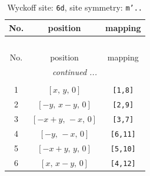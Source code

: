 \documentclass[fleqn,8pt]{jsarticle}
\begin{document}
\renewcommand{\arraystretch}{1.2}
\begin{longtable}{ccc}
\caption{Wyckoff site: {\tt 6d}, site symmetry: {\tt m'..}}
 \\
 \hline \hline
No. & position & mapping \\ \hline \endfirsthead

\multicolumn{2}{l}{\tablename\ \thetable{}} \\
 \hline \hline
No. & position & mapping \\ \hline \endhead

 \hline \hline
\multicolumn{2}{r}{\footnotesize\it continued ...} \\ \endfoot

 \hline \hline
\multicolumn{2}{r}{} \\ \endlastfoot

1 & $\left[ x,\, y,\, 0 \right]$ & {\tt [1,8]} \\ \hline
2 & $\left[ - y,\, x - y,\, 0 \right]$ & {\tt [2,9]} \\ \hline
3 & $\left[ - x + y,\, - x,\, 0 \right]$ & {\tt [3,7]} \\ \hline
4 & $\left[ - y,\, - x,\, 0 \right]$ & {\tt [6,11]} \\ \hline
5 & $\left[ - x + y,\, y,\, 0 \right]$ & {\tt [5,10]} \\ \hline
6 & $\left[ x,\, x - y,\, 0 \right]$ & {\tt [4,12]} \\
\end{longtable}
\renewcommand{\arraystretch}{1.2}
\end{document}
